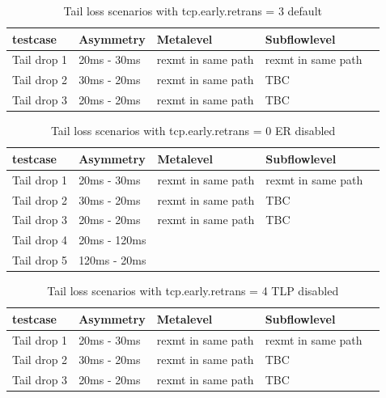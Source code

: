 \documentclass[12pt,draftcls,onecolumn]{IEEEtran}
\begin{document}
\begin{table}[!ht]
\centering
\caption{Tail loss scenarios with tcp.early.retrans = 3 default}
\label{ret3}
\begin{tabular}{|l|l|l|l|l|}
\hline
 testcase   & Asymmetry   & Metalevel          & Subflowlevel       &  \\\hline
Tail drop 1 & 20ms - 30ms & rexmt in same path & rexmt in same path &  \\\hline
Tail drop 2 & 30ms - 20ms & rexmt in same path & TBC                &  \\\hline
Tail drop 3 & 20ms - 20ms & rexmt in same path & TBC                &  \\ \hline
\end{tabular}
\end{table}





\begin{table}[!ht]
\centering
\caption{Tail loss scenarios with tcp.early.retrans = 0 ER disabled}
\label{ret0}
\begin{tabular}{|l|l|l|l|l|}
\hline
 testcase   & Asymmetry   & Metalevel          & Subflowlevel       &  \\\hline
Tail drop 1 & 20ms - 30ms & rexmt in same path & rexmt in same path &  \\\hline
Tail drop 2 & 30ms - 20ms & rexmt in same path & TBC                &  \\\hline
Tail drop 3 & 20ms - 20ms & rexmt in same path & TBC                & \\ \hline
Tail drop 4 & 20ms - 120ms &  			&		&  \\ \hline
Tail drop 5 & 120ms - 20ms &  			& 		& \\ \hline 
\end{tabular}
\end{table}


\begin{table}[!ht]
\centering
\caption{Tail loss scenarios with tcp.early.retrans = 4 TLP disabled}
\label{ret4}
\begin{tabular}{|l|l|l|l|l|}
\hline
 testcase   & Asymmetry   & Metalevel          & Subflowlevel       &  \\\hline
Tail drop 1 & 20ms - 30ms & rexmt in same path & rexmt in same path &  \\\hline
Tail drop 2 & 30ms - 20ms & rexmt in same path & TBC                &  \\\hline
Tail drop 3 & 20ms - 20ms & rexmt in same path & TBC                & \\ \hline
\end{tabular}
\end{table}
\end{document}
